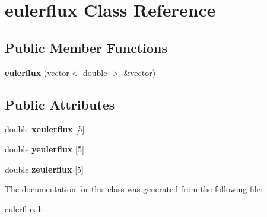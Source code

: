 \hypertarget{classeulerflux}{}\section{eulerflux Class Reference}
\label{classeulerflux}
\subsection*{Public Member Functions}
\begin{DoxyCompactItemize}
\item 
{\bfseries eulerflux} (vector$<$ double $>$ \&vector)\hypertarget{classeulerflux_a3e105f77497b722f0cb4a705cf55f8a1}{}\label{classeulerflux_a3e105f77497b722f0cb4a705cf55f8a1}

\end{DoxyCompactItemize}
\subsection*{Public Attributes}
\begin{DoxyCompactItemize}
\item 
double {\bfseries xeulerflux} \mbox{[}5\mbox{]}\hypertarget{classeulerflux_a439b504f5522213d14e4749bbf0541a6}{}\label{classeulerflux_a439b504f5522213d14e4749bbf0541a6}

\item 
double {\bfseries yeulerflux} \mbox{[}5\mbox{]}\hypertarget{classeulerflux_a43014dec3b24e45644e9e324e3f6e776}{}\label{classeulerflux_a43014dec3b24e45644e9e324e3f6e776}

\item 
double {\bfseries zeulerflux} \mbox{[}5\mbox{]}\hypertarget{classeulerflux_a4e99c1ab3d6e5e6487d9f6b370ddb0c6}{}\label{classeulerflux_a4e99c1ab3d6e5e6487d9f6b370ddb0c6}

\end{DoxyCompactItemize}


The documentation for this class was generated from the following file\+:\begin{DoxyCompactItemize}
\item 
eulerflux.\+h\end{DoxyCompactItemize}
